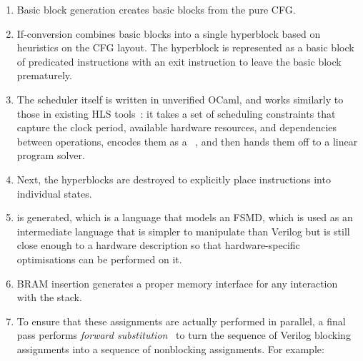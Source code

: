 \begin{enumerate}[label=\protect\blacknum{\arabic*}]
\item Basic block generation creates basic blocks from the pure \rtl{}
  \gls{CFG}.
\item If-conversion combines basic blocks into a single hyperblock based on
  heuristics on the \gls{CFG} layout.  The hyperblock is represented as a basic
  block of predicated instructions with an exit instruction to leave the basic
  block prematurely.
\item The scheduler itself is written in unverified OCaml, and works similarly
  to those in existing HLS tools~\cite[]{canis13_l}: it takes a set of
  scheduling constraints that capture the clock period, available hardware
  resources, and dependencies between operations, encodes them as a
  ~\cite[]{cong06_sdc}, and then hands them off to a linear
  program solver.
\item Next, the hyperblocks are destroyed to explicitly place instructions into
  individual states.
\item \htl{} is generated, which is a language that models an \gls{FSMD}, which
  is used as an intermediate language that is simpler to manipulate than Verilog
  but is still close enough to a hardware description so that hardware-specific
  optimisations can be performed on it.
\item \gls{BRAM} insertion generates a proper memory interface for any
  interaction with the stack.
\item To ensure that these assignments are actually performed in parallel, a
  final pass performs \emph{forward substitution}~\cite[p.~109]{hopwood78_decom}
  to turn the sequence of Verilog blocking assignments into a sequence of
  nonblocking assignments. For example:
%
\begin{center}
\end{center}
\end{enumerate}

